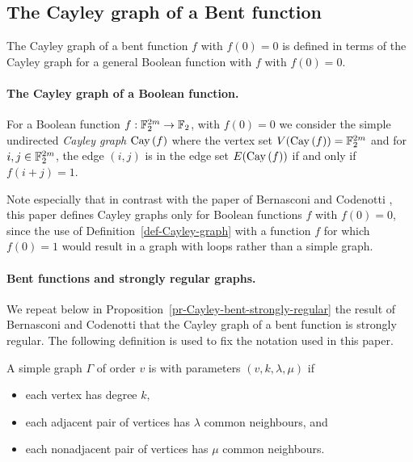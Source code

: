 \subsection{The Cayley graph of a Bent function}

The Cayley graph of a bent function $f$ with $f(0)=0$ is defined
in terms of the Cayley graph for a general Boolean function with $f$ with $f(0)=0$.
\paragraph*{The Cayley graph of a Boolean function.}
\begin{Definition}
\label{def-Cayley-graph}
For a Boolean function $f : \mathbb{F}_2^{2 m} \rightarrow \mathbb{F}_2$, with $f(0)=0$ we consider the simple undirected
\emph{Cayley graph} $\operatorname{Cay}\left(f\right)$  \cite[3.1]{BerC99}
where the vertex set $V(\operatorname{Cay}\left(f\right)) = \mathbb{F}_2^{2 m}$ and for $i,j \in \mathbb{F}_2^{2 m}$, the edge $(i,j)$ is in
the edge set $E(\operatorname{Cay}\left(f\right))$ if and only if $f(i+j)=1$.
\end{Definition}
Note especially that in contrast with the paper of Bernasconi and Codenotti \cite{BerC99},
this paper defines Cayley graphs only for Boolean functions $f$ with $f(0)=0$,
since the use of Definition~\ref{def-Cayley-graph} with a function $f$ for which $f(0)=1$ would
result in a graph with loops rather than a simple graph.

\paragraph*{Bent functions and strongly regular graphs.}
We repeat below in Proposition~\ref{pr-Cayley-bent-strongly-regular}
the result of Bernasconi and Codenotti \cite{BerC99}
that the Cayley graph of a bent function is strongly regular.
The following definition is used to fix the notation used in this paper.
\begin{Definition}
\label{def-strongly-regular-graph}
%
A simple graph $\Gamma$ of order $v$ is  \cite{Bos63,BroCN89,Sei79} with
parameters
$(v,k,\lambda,\mu)$ if
\begin{itemize}
 \item
each vertex has degree $k,$
 \item
each adjacent pair of vertices has $\lambda$ common neighbours, and
\item
each nonadjacent pair of vertices has $\mu$ common neighbours.
\end{itemize}
%
\end{Definition}
%

